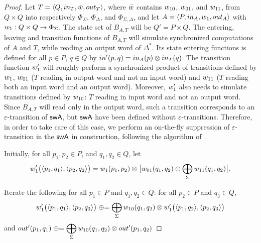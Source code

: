 \begin{proof}
Let $T = \< Q, \init_T, \bar{\wei}, \final_T >$,
where $\bar{\wei}$ contains $\wei_{10}$, $\wei_{01}$, and $\wei_{11}$,
from $Q \times Q$ into respectively
$\Phi_{\Sigma}$, $\Phi_{\Delta}$, and $\Phi_{\Sigma, \Delta}$,
and let $A = \< P, \init_A, \wei_1, \final_A >$
with $\wei_1: Q \times Q \to \Phi_{\Sigma}$.
%
\noindent
The state set of $B_{A, T}$ will be $Q' = P \times Q$.
The entering, leaving and transition functions of $B_{A, T}$ will
simulate synchronized computations of $A$ and $T$,
while reading an output word of $\Delta^*$.
%
Its state entering functions is defined
for all $p \in P$, $q \in Q$
by $\init'(p, q) = \init_A(p) \otimes \init_T(q)$.
The transition function $\wei'_1$ will roughly perform
a synchronized product of transitions defined by $\wei_1$,
$\wei_{01}$ ($T$ reading in output word and not an input word)
and $\wei_{11}$ ($T$ reading both an input word and an output word).
%
Moreover, $\wei'_1$ also needs to simulate transitions
defined by $\wei_{10}$: $T$ reading in input word and not an output word.
Since $B_{A, T}$  will read only in the output word, such a transition corresponds
to an $\varepsilon$-transition of $\textsf{swA}$,
but $\textsf{swA}$ have been defined without $\varepsilon$-transitions.
Therefore, in order to take care of this case, we perform an on-the-fly
suppression of $\varepsilon$-transition in the $\textsf{swA}$ in construction,
following the algorithm of~\cite{LombardySakarovitch12ciaa}.
%


\noindent
Initially, for all $p_1, p_2 \in P$, and $q_1, q_2 \in Q$, let
\[
\wei'_1\bigl( \< p_1, q_1>, \< p_2, q_2>\bigr) =
\wei_1(p_1, p_2) \otimes
\bigl[
\wei_{01}(q_1, q_2)
\oplus
\displaystyle\bigoplus_{\Sigma}
\wei_{11}(q_1, q_2)
\bigr].
\]

\noindent
Iterate the following for all $p_1\in P$ and $q_1, q_2 \in Q$:
for all $p_2\in P$ and $q_3 \in Q$,
\[
\wei'_1\bigl( \< p_1, q_1>, \< p_2, q_3>\bigr) \opluseq
\displaystyle\bigoplus_{\Sigma} \wei_{10}(q_1, q_2)
\otimes
\wei'_1\bigl( \< p_1, q_2>, \< p_2, q_3>\bigr)
\]
and
\(
\final'(p_1, q_1) \opluseq
\displaystyle\bigoplus_{\Sigma} \wei_{10}(q_1, q_2)
\otimes \final'(p_1, q_2)
\)
\end{proof}

